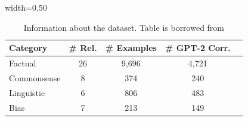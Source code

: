 \addtolength{\tabcolsep}{-3pt}
\begin{table}
    \centering
    \scriptsize
    \vspace{-8pt}
    \begin{adjustbox}{width=0.50\textwidth}
        \begin{tabular}{lcccc}
        \toprule
        \textbf{Category} & \textbf{\# Rel.} & \textbf{\# Examples} & \textbf{\# GPT-2 Corr.} \\
        \midrule
        Factual & 26 & 9,696 & 4,721 \\
        Commonsense & 8 & 374 & 240 \\
        Linguistic & 6 & 806 & 483 \\
        Bias & 7 & 213 & 149 \\
        \bottomrule
    \end{tabular}
    \end{adjustbox}
    \caption{\small Information about the dataset.
    Table is borrowed from \citet{hernandez2024linearity}}
    \label{tab:dataset}
    \vspace{-15pt}
\end{table}
\addtolength{\tabcolsep}{3pt}